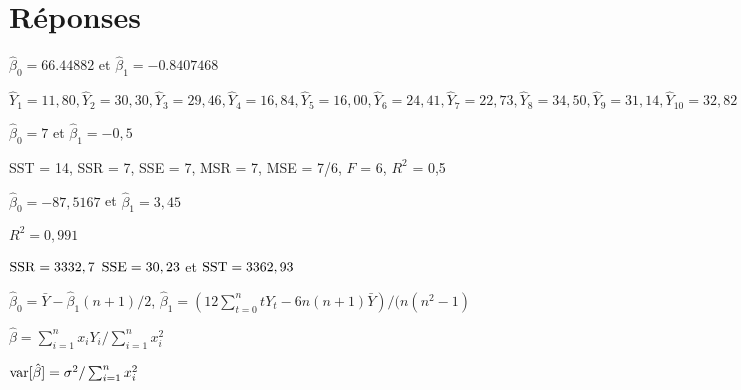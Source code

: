 \bigskip
\section*{Réponses}

\begin{reponse}{2.1}
    \begin{inparaenum}
    \item $\hat{\beta}_0=66.44882$ et $\hat{\beta}_1=-0.8407468$
    \item $\hat{Y}_1 = 11,80, \hat{Y}_2 = 30,30, \hat{Y}_3 = 29,46,
      \hat{Y}_4 = 16,84, \hat{Y}_5 = 16,00, \hat{Y}_6 = 24,41,
      \hat{Y}_7 = 22,73, \hat{Y}_8 = 34,50, \hat{Y}_9 = 31,14,
      \hat{Y}_{10} = 32,82$
    \end{inparaenum}
  
\end{reponse}
\begin{reponse}{2.2}
    \begin{inparaenum}
    \item $\hat{\beta}_0=7$ et $\hat{\beta}_1=-0,5$
    \item SST = 14, SSR = 7, SSE = 7, MSR = 7, MSE = 7/6, $F$ = 6, $R^2$ = 0,5
    \end{inparaenum}
  
\end{reponse}
\begin{reponse}{2.3}
    \begin{inparaenum}
    \item
      $\hat{\beta}_0 = -87,5167$
      et
      $\hat{\beta}_1 = 3,45$
    \item $R^2 = 0,991$
    \item
      $\mathrm{SSR} = 3332,7$
      $\mathrm{SSE} = 30,23$ et
      $\mathrm{SST} = 3362,93$
    \end{inparaenum}
  
\end{reponse}
\begin{reponse}{2.5}
    $\hat{\beta}_0 = \bar{Y} - \hat{\beta}_1 (n + 1)/2$,
    $\hat{\beta}_1 = (12 \sum_{t = 0}^n t Y_t - 6 n (n + 1)
    \bar{Y})/(n (n^2 - 1)$
  
\end{reponse}
\begin{reponse}{2.6}
    \begin{inparaenum}
    \item $\hat{\beta}= \sum_{i = 1}^n x_i Y_i/\sum_{i = 1}^n x_i^2$
    \item $\mathrm{var} [ \hat{\beta} ] = \sigma^2/\sum_{i = 1}^n x_i^2$
    \end{inparaenum}
  
\end{reponse}
